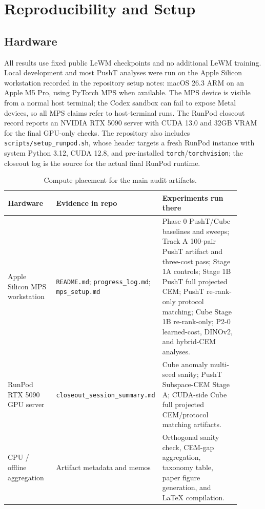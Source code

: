 \section{Reproducibility and Setup}
\label{app:reproducibility}

\subsection{Hardware}

All results use fixed public LeWM checkpoints and no additional LeWM training. Local
development and most PushT analyses were run on the Apple Silicon workstation
recorded in the repository setup notes: macOS 26.3 ARM on an Apple M5 Pro, using
PyTorch MPS when available. The MPS device is visible from a normal host
terminal; the Codex sandbox can fail to expose Metal devices, so all MPS claims
refer to host-terminal runs. The RunPod closeout record reports an NVIDIA RTX
5090 server with CUDA 13.0 and 32GB VRAM for the final GPU-only checks. The
repository also includes \texttt{scripts/setup\_runpod.sh}, whose header targets
a fresh RunPod instance with system Python 3.12, CUDA 12.8, and pre-installed
\texttt{torch}/\texttt{torchvision}; the closeout log is the source for the
actual final RunPod runtime.

\begin{table}[h]
\centering
\scriptsize
\begin{tabular}{p{0.22\linewidth}p{0.28\linewidth}p{0.40\linewidth}}
\toprule
Hardware & Evidence in repo & Experiments run there \\
\midrule
Apple Silicon MPS workstation & \texttt{README.md}; \texttt{progress\_log.md}; \texttt{mps\_setup.md} & Phase 0 PushT/Cube baselines and sweeps; Track A 100-pair PushT artifact and three-cost pass; Stage 1A controls; Stage 1B PushT full projected CEM; PushT re-rank-only protocol matching; Cube Stage 1B re-rank-only; P2-0 learned-cost, DINOv2, and hybrid-CEM analyses. \\
RunPod RTX 5090 GPU server & \texttt{closeout\_session\_summary.md} & Cube anomaly multi-seed sanity; PushT Subspace-CEM Stage A; CUDA-side Cube full projected CEM/protocol matching artifacts. \\
CPU / offline aggregation & Artifact metadata and memos & Orthogonal sanity check, CEM-gap aggregation, taxonomy table, paper figure generation, and LaTeX compilation. \\
\bottomrule
\end{tabular}
\caption{Compute placement for the main audit artifacts.}
\label{tab:appendix-hardware}
\end{table}


